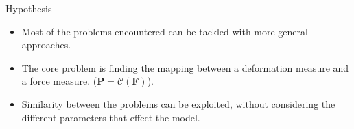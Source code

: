 \begin{frame}{Hypothesis}
  \begin{itemize} 
    \item Most of the problems encountered can be tackled with more general approaches.
    \item The core problem is finding the mapping between a deformation measure and a force measure. ($\mathbf{P}=\mathcal{C}(\mathbf{F})$).
    \item Similarity between the problems can be exploited, without considering the different parameters that effect the model.
  \end{itemize}
\end{frame}






